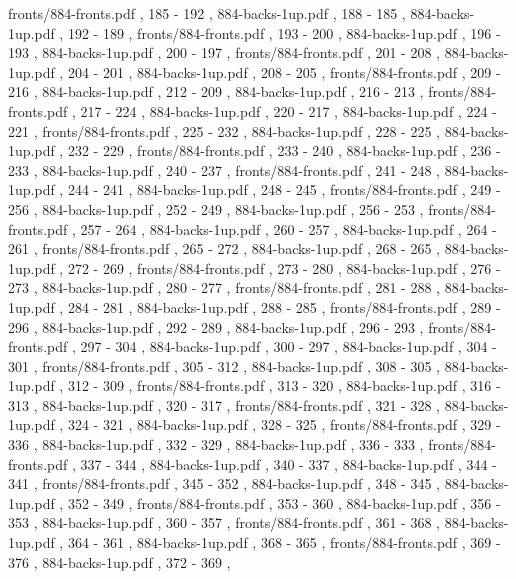 \documentclass[letterpaper]{article}
\begin{document}
{			fronts/884-fronts.pdf	,	185	-	192	,
			884-backs-1up.pdf		,	188	-	185	,
			884-backs-1up.pdf		,	192	-	189	,
			fronts/884-fronts.pdf	,	193	-	200	,
			884-backs-1up.pdf		,	196	-	193	,
			884-backs-1up.pdf		,	200	-	197	,
			fronts/884-fronts.pdf	,	201	-	208	,
			884-backs-1up.pdf		,	204	-	201	,
			884-backs-1up.pdf		,	208	-	205	,
			fronts/884-fronts.pdf	,	209	-	216	,
			884-backs-1up.pdf		,	212	-	209	,
			884-backs-1up.pdf		,	216	-	213	,
			fronts/884-fronts.pdf	,	217	-	224	,
			884-backs-1up.pdf		,	220	-	217	,
			884-backs-1up.pdf		,	224	-	221	,
			fronts/884-fronts.pdf	,	225	-	232	,
			884-backs-1up.pdf		,	228	-	225	,
			884-backs-1up.pdf		,	232	-	229	,
			fronts/884-fronts.pdf	,	233	-	240	,
			884-backs-1up.pdf		,	236	-	233	,
			884-backs-1up.pdf		,	240	-	237	,
			fronts/884-fronts.pdf	,	241	-	248	,
			884-backs-1up.pdf		,	244	-	241	,
			884-backs-1up.pdf		,	248	-	245	,
			fronts/884-fronts.pdf	,	249	-	256	,
			884-backs-1up.pdf		,	252	-	249	,
			884-backs-1up.pdf		,	256	-	253	,
			fronts/884-fronts.pdf	,	257	-	264	,
			884-backs-1up.pdf		,	260	-	257	,
			884-backs-1up.pdf		,	264	-	261	,
			fronts/884-fronts.pdf	,	265	-	272	,
			884-backs-1up.pdf		,	268	-	265	,
			884-backs-1up.pdf		,	272	-	269	,
			fronts/884-fronts.pdf	,	273	-	280	,
			884-backs-1up.pdf		,	276	-	273	,
			884-backs-1up.pdf		,	280	-	277	,
			fronts/884-fronts.pdf	,	281	-	288	,
			884-backs-1up.pdf		,	284	-	281	,
			884-backs-1up.pdf		,	288	-	285	,
			fronts/884-fronts.pdf	,	289	-	296	,
			884-backs-1up.pdf		,	292	-	289	,
			884-backs-1up.pdf		,	296	-	293	,
			fronts/884-fronts.pdf	,	297	-	304	,
			884-backs-1up.pdf		,	300	-	297	,
			884-backs-1up.pdf		,	304	-	301	,
			fronts/884-fronts.pdf	,	305	-	312	,
			884-backs-1up.pdf		,	308	-	305	,
			884-backs-1up.pdf		,	312	-	309	,
			fronts/884-fronts.pdf	,	313	-	320	,
			884-backs-1up.pdf		,	316	-	313	,
			884-backs-1up.pdf		,	320	-	317	,
			fronts/884-fronts.pdf	,	321	-	328	,
			884-backs-1up.pdf		,	324	-	321	,
			884-backs-1up.pdf		,	328	-	325	,
			fronts/884-fronts.pdf	,	329	-	336	,
			884-backs-1up.pdf		,	332	-	329	,
			884-backs-1up.pdf		,	336	-	333	,
			fronts/884-fronts.pdf	,	337	-	344	,
			884-backs-1up.pdf		,	340	-	337	,
			884-backs-1up.pdf		,	344	-	341	,
			fronts/884-fronts.pdf	,	345	-	352	,
			884-backs-1up.pdf		,	348	-	345	,
			884-backs-1up.pdf		,	352	-	349	,
			fronts/884-fronts.pdf	,	353	-	360	,
			884-backs-1up.pdf		,	356	-	353	,
			884-backs-1up.pdf		,	360	-	357	,
			fronts/884-fronts.pdf	,	361	-	368	,
			884-backs-1up.pdf		,	364	-	361	,
			884-backs-1up.pdf		,	368	-	365	,
			fronts/884-fronts.pdf	,	369	-	376	,
			884-backs-1up.pdf		,	372	-	369	,
}
\end{document}
